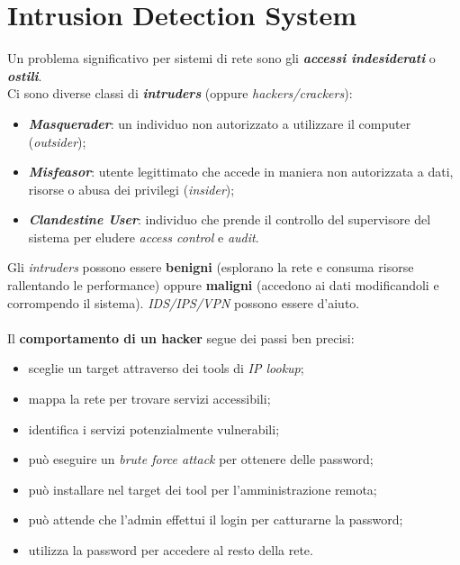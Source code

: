 \documentclass[11pt, a4paper, twoside, italian]{report}
\theoremstyle{plain}
\begin{document}
\chapter*{Intrusion Detection System}
Un problema significativo per sistemi di rete sono gli \textit{\textbf{accessi indesiderati}} o \textit{\textbf{ostili}}.\\
Ci sono diverse classi di \textit{\textbf{intruders}} (oppure \textit{hackers/crackers}):
\begin{itemize}
	\item \textit{\textbf{Masquerader}}: un individuo non autorizzato a utilizzare il computer (\textit{outsider});
	\item \textit{\textbf{Misfeasor}}: utente legittimato che accede in maniera non autorizzata a dati, risorse o abusa dei privilegi (\textit{insider});
	\item \textit{\textbf{Clandestine User}}: individuo che prende il controllo del supervisore del sistema per eludere \textit{access control} e \textit{audit}.
\end{itemize}
\noindent
Gli \textit{intruders} possono essere \textbf{benigni} (esplorano la rete e consuma risorse rallentando le performance) oppure \textbf{maligni} (accedono ai dati modificandoli e corrompendo il sistema). \textit{IDS/IPS/VPN} possono essere d'aiuto.\\
\\
Il \textbf{comportamento di un hacker} segue dei passi ben precisi:
\begin{multicols}{2}
	\begin{itemize}
		\item sceglie un target attraverso dei tools di \textit{IP lookup};
		\item mappa la rete per trovare servizi accessibili;
		\item identifica i servizi potenzialmente vulnerabili;
		\item può eseguire un \textit{brute force attack} per ottenere delle password;
	\end{itemize}
\columnbreak
	\begin{itemize}
		\item può installare nel target dei tool per l'amministrazione remota;
		\item può attende che l'admin effettui il login per catturarne la password;
		\item utilizza la password per accedere al resto della rete.
	\end{itemize}
\end{multicols}
\end{document}
